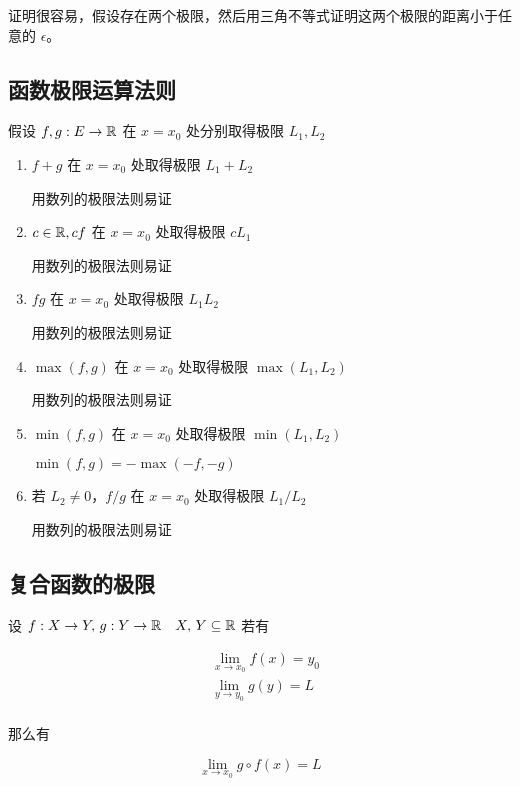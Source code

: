 证明很容易，假设存在两个极限，然后用三角不等式证明这两个极限的距离小于任意的 $\epsilon$。

\subsection{函数极限运算法则}

假设 $f,g : E \to \mathbb{R}$ 在 $x = x_0$ 处分别取得极限 $L_1, L_2$

\begin{enumerate}
    \item $f+g$ 在 $x = x_0$ 处取得极限 $L_1 + L_2$

    用数列的极限法则易证

    \item $c \in \mathbb{R}, cf$ 在 $x = x_0$ 处取得极限 $cL_1$

    用数列的极限法则易证

    \item $fg$ 在 $x = x_0$ 处取得极限 $L_1 L_2$

    用数列的极限法则易证

    \item $\max(f,g)$ 在 $x = x_0$ 处取得极限 $\max(L_1, L_2)$

    用数列的极限法则易证

    \item $\min(f,g)$ 在 $x = x_0$ 处取得极限 $\min(L_1, L_2)$
    
    $\min(f,g) = -\max(-f,-g)$

    \item 若 $L_2 \ne 0$，$f/g$ 在 $x = x_0$ 处取得极限 $L_1/L_2$

    用数列的极限法则易证

\end{enumerate}

\subsection{复合函数的极限}

设 $f: X \to Y,\, g: Y \to \mathbb{R}\quad X,\, Y \subseteq \mathbb{R}$ 若有

\begin{align*}
& \lim_{x \to x_0} f(x) = y_0 \\
& \lim_{y \to y_0} g(y) = L \\
\end{align*}

那么有

\[
    \lim_{x \to x_0} g \circ f(x) = L 
\]


